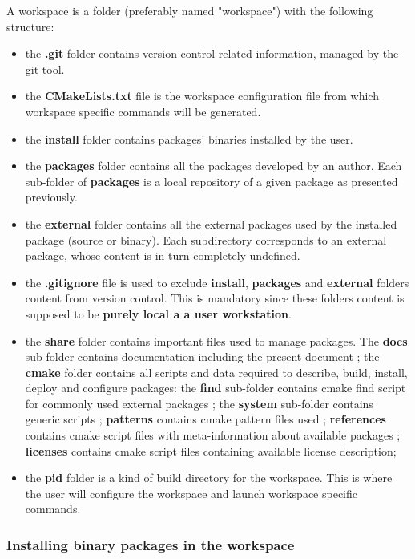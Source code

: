\documentclass[12pt,a4paper]{article}
\begin{document}
A workspace is a folder (preferably named "workspace") with the following structure:
\begin{itemize}
\item the \textbf{.git} folder contains version control related information, managed by the git tool.
\item the \textbf{CMakeLists.txt} file is the workspace configuration file from which workspace specific commands will be generated.
\item the \textbf{install} folder contains packages' binaries installed by the user. 
\item the \textbf{packages} folder contains all the packages developed by an author. Each sub-folder of \textbf{packages} is a local repository of a given package as presented previously.
\item the \textbf{external} folder contains all the external packages used by the installed package (source or binary). Each subdirectory corresponds to an external package, whose content is in turn completely undefined.
\item the \textbf{.gitignore} file is used to exclude  \textbf{install}, \textbf{packages} and \textbf{external} folders content from version control. This is mandatory since these folders content is supposed to be \textbf{ purely local a a user workstation}.
\item the \textbf{share} folder contains important files used to manage packages. The \textbf{docs} sub-folder contains documentation including the present document ; the \textbf{cmake} folder contains all scripts and data required to describe, build, install, deploy and configure packages: the \textbf{find} sub-folder contains cmake find script for commonly used external packages ; the \textbf{system} sub-folder contains generic scripts ; \textbf{patterns} contains cmake pattern files used ; \textbf{references} contains cmake script files with meta-information about available packages ; \textbf{licenses} contains cmake script files containing available license description;
\item the \textbf{pid} folder is a kind of build directory for the workspace. This is where the user will configure the workspace and launch workspace specific commands.
\end{itemize}

\subsubsection{Installing binary packages in the workspace}
\label{sec:workspaceInstall}
\end{document}
